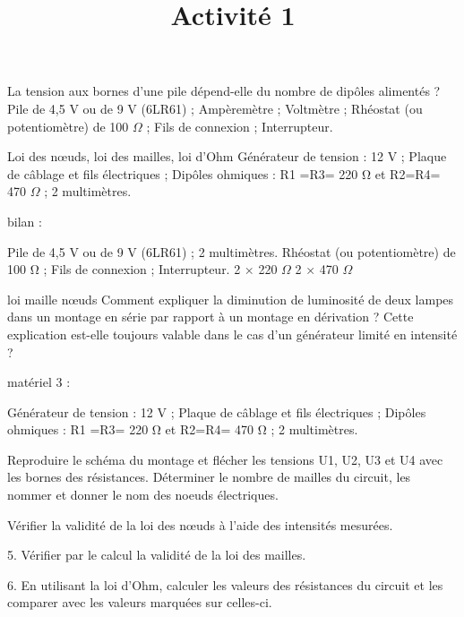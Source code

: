 \documentclass[10pt]{article}
\newcommand{\titreActivite}{Activité 1} %
\begin{document}
La tension aux bornes d’une pile dépend-elle du nombre de dipôles alimentés ?
Pile de 4,5 V ou de 9 V (6LR61) ;
Ampèremètre ;
Voltmètre ;
Rhéostat (ou potentiomètre) de 100 $Ω$ ;
Fils de connexion ;
Interrupteur.

Loi des nœuds, loi des mailles, loi d'Ohm
Générateur de tension : 12 V ;
Plaque de câblage et fils électriques ;
Dipôles ohmiques : R1​ =R3​= 220 Ω et R2​=R4​= 470 $Ω$ ;
2 multimètres.


bilan :

Pile de 4,5 V ou de 9 V (6LR61) ;
2 multimètres.
Rhéostat (ou potentiomètre) de 100 Ω ;
Fils de connexion ;
Interrupteur.
2 × 220 $Ω$
2 × 470 $Ω$

\date{}
\title{\titreActivite}
\maketitle %




\begin{center}
	loi maille nœuds
	Comment expliquer la diminution de luminosité de deux lampes dans un montage en série par rapport à un montage en dérivation ? Cette explication est-elle toujours valable dans le cas d'un générateur limité en intensité ?


	matériel 3 :


	Générateur de tension : 12 V ;
	Plaque de câblage et fils électriques ;
	Dipôles ohmiques : R1​ =R3​= 220 Ω et R2​=R4​= 470 Ω ;
	2 multimètres.

	Reproduire le schéma du montage et flécher les tensions U1​, U2​, U3​ et U4​ avec les bornes des résistances.
	Déterminer le nombre de mailles du circuit, les nommer et donner le nom des noeuds électriques.

	Vérifier la validité de la loi des nœuds à l'aide des intensités mesurées.


	5. Vérifier par le calcul la validité de la loi des mailles.


	6. En utilisant la loi d'Ohm, calculer les valeurs des résistances du circuit et les comparer avec les valeurs marquées sur celles-ci.

\end{center}
\end{document}
